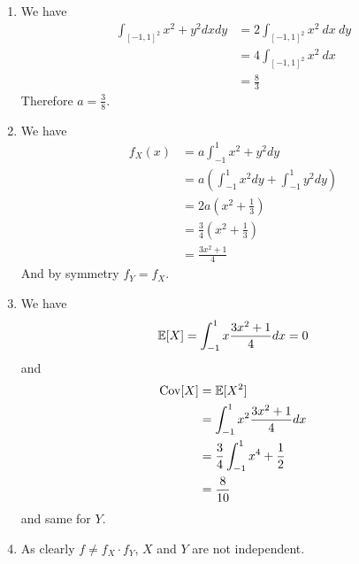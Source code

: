 \begin{solution}
  \begin{enumerate}
    \item We have
          \begin{align*}
            \int_{{[-1, 1]}^2} x^2 + y^2 dx dy & = 2 \int_{{[-1, 1]}^2} x^2 ~ dx ~ dy \\
                                               & = 4 \int_{{[-1, 1]}^2} x^2 ~ dx      \\
                                               & = \frac{8}{3}
          \end{align*}
          Therefore $a = \frac{3}{8}$.
    \item We have
          \begin{align*}
            f_X(x) & = a \int_{-1}^1 x^2 + y^2 dy                               \\
                   & = a \left( \int_{-1}^1 x^2 dy + \int_{-1}^1 y^2 dy \right) \\
                   & = 2 a (x^2 + \frac{1}{3})                                  \\
                   & = \frac{3}{4} (x^2 + \frac{1}{3})                          \\
                   & = \frac{3x^2 + 1}{4}
          \end{align*}
          And by symmetry $f_Y = f_X$.
    \item We have
          $$\mathbb{E}[X] = \int_{-1}^1 x \frac{3x^2 + 1}{4} dx = 0 $$
          and
          \begin{align*}
            \operatorname{Cov}[X] & = \mathbb{E}[X^2]                           \\
                    & = \int_{-1}^1 x^2  \frac{3x^2 + 1}{4} dx    \\
                    & = \frac{3}{4} \int_{-1}^1 x^4 + \frac{1}{2} \\
                    & = \frac{8}{10}
          \end{align*}
          and same for $Y$.
    \item As clearly $f \neq f_X \cdot f_Y$, $X$ and $Y$ are not independent.
  \end{enumerate}
\end{solution}


